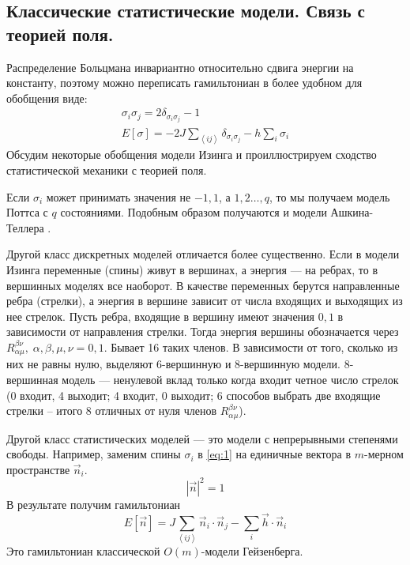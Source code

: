 \documentclass[a4paper,12pt]{article}
\theoremstyle{definition}
\theoremstyle{definition}
\theoremstyle{definition}
\begin{document}
\subsection{Классические статистические модели. Связь с теорией поля.}
\label{sec:statistical-models-qft}

Распределение Больцмана инвариантно относительно сдвига энергии на константу, поэтому можно переписать гамильтониан в более удобном для обобщения виде:
\begin{equation}
  \label{eq:12}
  \begin{array}{l}
    \sigma_i\sigma_j=2\delta_{\sigma_i\sigma_j}-1\\
    E[\sigma]=-2J\sum_{\left<ij\right>}\delta_{\sigma_i\sigma_j}-h\sum_i \sigma_i
  \end{array}
\end{equation}
Обсудим некоторые обобщения модели Изинга и проиллюстрируем сходство статистической механики с теорией поля.

Если $\sigma_i$ может принимать значения не $-1,1$, а $1,2\dots,q$, то мы получаем модель Поттса с $q$ состояниями.
Подобным образом получаются и модели Ашкина-Теллера \cite{difrancesco1997cft}.

Другой класс дискретных моделей отличается более существенно. Если в модели Изинга переменные (спины) живут в вершинах, а энергия --- на ребрах, то в вершинных моделях все наоборот. В качестве переменных берутся направленные ребра (стрелки), а энергия в вершине зависит от числа входящих и выходящих из нее стрелок. Пусть ребра, входящие в вершину имеют значения $0,1$ в зависимости от направления стрелки. Тогда энергия вершины обозначается через $R_{\alpha\mu}^{\beta\nu},\; \alpha,\beta,\mu,\nu=0,1$. Бывает 16 таких членов. В зависимости от того, сколько из них не равны нулю, выделяют 6-вершинную и 8-вершинную модели. 8-вершинная модель --- ненулевой вклад только когда входит четное число стрелок (0 входит, 4 выходит; 4 входит, 0 выходит; 6 способов выбрать две входящие стрелки -- итого 8 отличных от нуля членов $R_{\alpha\mu}^{\beta\nu}$). 

Другой класс статистических моделей --- это модели с непрерывными степенями свободы. Например, заменим спины $\sigma_i$ в \eqref{eq:1} на единичные вектора в $m$-мерном пространстве $\vec n_i$.
\begin{equation}
  \label{eq:14}
  \left|\vec n\right|^2=1
\end{equation}
В результате получим гамильтониан
\begin{equation}
  \label{eq:13}
  E[\vec n]=J\sum_{\left<ij\right>}\vec n_i\cdot \vec n_j-\sum_i \vec h\cdot \vec n_i
\end{equation}
Это гамильтониан классической $O(m)$-модели Гейзенберга. 
\end{document}
